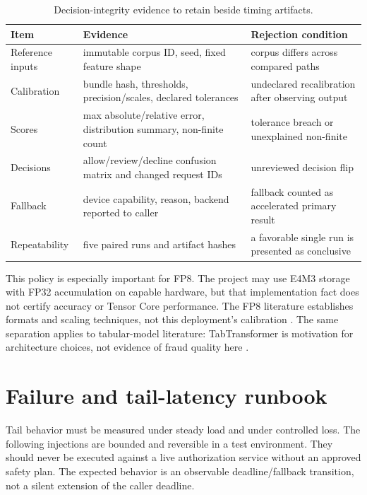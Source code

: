 \documentclass[10pt,a4paper,twocolumn]{article}
\begin{document}
\begin{table}[t]\centering\scriptsize
\caption{Decision-integrity evidence to retain beside timing artifacts.}\label{tab:numeric}
\begin{tabularx}{\columnwidth}{@{}lY Y@{}}\toprule
Item & Evidence & Rejection condition \\\midrule
Reference inputs & immutable corpus ID, seed, fixed feature shape & corpus differs across compared paths \\
Calibration & bundle hash, thresholds, precision/scales, declared tolerances & undeclared recalibration after observing output \\
Scores & max absolute/relative error, distribution summary, non-finite count & tolerance breach or unexplained non-finite \\
Decisions & allow/review/decline confusion matrix and changed request IDs & unreviewed decision flip \\
Fallback & device capability, reason, backend reported to caller & fallback counted as accelerated primary result \\
Repeatability & five paired runs and artifact hashes & a favorable single run is presented as conclusive \\\bottomrule
\end{tabularx}\end{table}

This policy is especially important for FP8. The project may use E4M3 storage
with FP32 accumulation on capable hardware, but that implementation fact does
not certify accuracy or Tensor Core performance. The FP8 literature establishes
formats and scaling techniques, not this deployment's calibration \cite{fp8}.
The same separation applies to tabular-model literature: TabTransformer is
motivation for architecture choices, not evidence of fraud quality here
\cite{tabtransformer}.

\clearpage
\section{Failure and tail-latency runbook}
Tail behavior must be measured under steady load and under controlled loss. The
following injections are bounded and reversible in a test environment. They
should never be executed against a live authorization service without an
approved safety plan. The expected behavior is an observable deadline/fallback
transition, not a silent extension of the caller deadline.
\end{document}
